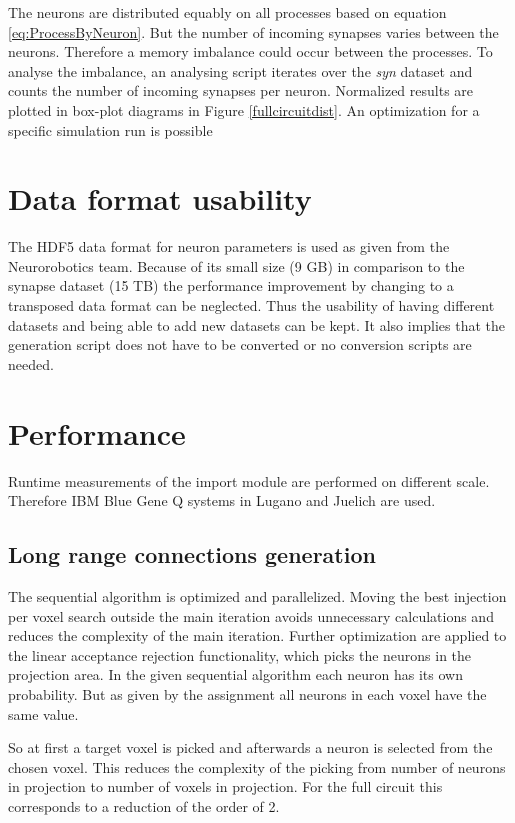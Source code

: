 The neurons are distributed equably on all processes based on equation \ref{eq:ProcessByNeuron}.
But the number of incoming synapses varies between the neurons.
Therefore a memory imbalance could occur between the processes.
To analyse the imbalance, an analysing script iterates over the \emph{syn} dataset and counts
the number of incoming synapses per neuron. Normalized results are plotted in box-plot diagrams 
in Figure \ref{fullcircuitdist}. An optimization for a specific simulation run is possible


\section{Data format usability}
The HDF5 data format for neuron parameters is used as given from the Neurorobotics team.
Because of its small size (9 GB) in comparison to the synapse dataset (15 TB) the performance improvement by changing
to a transposed data format can be neglected. Thus the usability of having different datasets and being able
to add new datasets can be kept. It also implies that the generation script does not have to be converted or no 
conversion scripts are needed.

\section{Performance}
Runtime measurements of the import module are performed on different scale.
Therefore IBM Blue Gene Q systems in Lugano and Juelich are used.

\subsection{Long range connections generation}
The sequential algorithm is optimized and parallelized. Moving the best injection per voxel search outside the main iteration
avoids unnecessary calculations and reduces the complexity of the main iteration. Further optimization are applied
to the linear acceptance rejection functionality, which picks the neurons in the projection area.
In the given sequential algorithm each neuron has its own probability.
But as given by the assignment all neurons in each voxel have the same value.

So at first a target voxel is picked and afterwards a neuron is selected from the chosen voxel.
This reduces the complexity of the picking from number of neurons in projection to number of voxels in projection.
For the full circuit this corresponds to a reduction of the order of 2.


